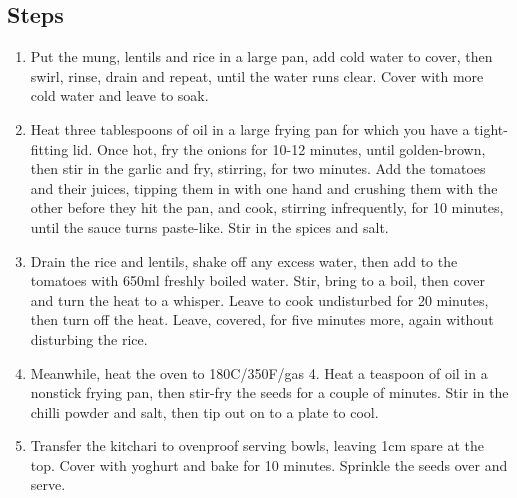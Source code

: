\documentclass{book}
\begin{document}
\subsection*{Steps}
\begin{enumerate}
\item Put the mung, lentils and rice in a large pan, add cold water to cover, then swirl, rinse, drain and repeat, until the water runs clear. Cover with more cold water and leave to soak.
\item Heat three tablespoons of oil in a large frying pan for which you have a tight-fitting lid. Once hot, fry the onions for 10-12 minutes, until golden-brown, then stir in the garlic and fry, stirring, for two minutes. Add the tomatoes and their juices, tipping them in with one hand and crushing them with the other before they hit the pan, and cook, stirring infrequently, for 10 minutes, until the sauce turns paste-like. Stir in the spices and salt.
\item Drain the rice and lentils, shake off any excess water, then add to the tomatoes with 650ml freshly boiled water. Stir, bring to a boil, then cover and turn the heat to a whisper. Leave to cook undisturbed for 20 minutes, then turn off the heat. Leave, covered, for five minutes more, again without disturbing the rice.
\item Meanwhile, heat the oven to 180C/350F/gas 4. Heat a teaspoon of oil in a nonstick frying pan, then stir-fry the seeds for a couple of minutes. Stir in the chilli powder and salt, then tip out on to a plate to cool.
\item Transfer the kitchari to ovenproof serving bowls, leaving 1cm spare at the top. Cover with yoghurt and bake for 10 minutes. Sprinkle the seeds over and serve.
\end{enumerate}
\newpage
\end{document}
